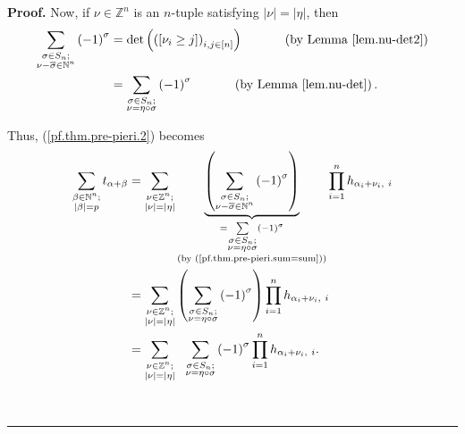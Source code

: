 \documentclass[numbers=enddot,12pt,final,onecolumn,notitlepage,english]{scrartcl}%
\theoremstyle{definition}
\newenvironment{proof}[1][Proof]{\noindent\textbf{#1.} }{\ \rule{0.5em}{0.5em}}
\let\sumnonlimits\sum
\let\prodnonlimits\prod
\renewcommand{\sum}{\sumnonlimits\limits}
\renewcommand{\prod}{\prodnonlimits\limits}
\newenvironment{verlong}{}{}
\begin{document}
\begin{verlong}
\begin{proof}
Now, if $\nu\in\mathbb{Z}^{n}$ is an $n$-tuple satisfying $\left\vert
\nu\right\vert =\left\vert \eta\right\vert $, then%
\begin{align}
\sum_{\substack{\sigma\in S_{n};\\\nu-\overline{\sigma}\in\mathbb{N}^{n}%
}}\left(  -1\right)  ^{\sigma}  &  =\det\left(  \left(  \left[  \nu_{i}\geq
j\right]  \right)  _{i,j\in\left[  n\right]  }\right)
\ \ \ \ \ \ \ \ \ \ \left(  \text{by Lemma \ref{lem.nu-det2}}\right)
\nonumber\\
&  =\sum_{\substack{\sigma\in S_{n};\\\nu=\eta\circ\sigma}}\left(  -1\right)
^{\sigma}\ \ \ \ \ \ \ \ \ \ \left(  \text{by Lemma \ref{lem.nu-det}}\right)
. \label{pf.thm.pre-pieri.sum=sum}%
\end{align}


Thus, (\ref{pf.thm.pre-pieri.2}) becomes%
\begin{align}
\sum_{\substack{\beta\in\mathbb{N}^{n};\\\left\vert \beta\right\vert
=p}}t_{\alpha+\beta}  &  =\sum_{\substack{\nu\in\mathbb{Z}^{n};\\\left\vert
\nu\right\vert =\left\vert \eta\right\vert }}\underbrace{\left(
\sum_{\substack{\sigma\in S_{n};\\\nu-\overline{\sigma}\in\mathbb{N}^{n}%
}}\left(  -1\right)  ^{\sigma}\right)  }_{\substack{=\sum_{\substack{\sigma\in
S_{n};\\\nu=\eta\circ\sigma}}\left(  -1\right)  ^{\sigma}\\\text{(by
(\ref{pf.thm.pre-pieri.sum=sum}))}}}\prod_{i=1}^{n}h_{\alpha_{i}+\nu_{i}%
,\ i}\nonumber\\
&  =\sum_{\substack{\nu\in\mathbb{Z}^{n};\\\left\vert \nu\right\vert
=\left\vert \eta\right\vert }}\left(  \sum_{\substack{\sigma\in S_{n}%
;\\\nu=\eta\circ\sigma}}\left(  -1\right)  ^{\sigma}\right)  \prod_{i=1}%
^{n}h_{\alpha_{i}+\nu_{i},\ i}\nonumber\\
&  =\sum_{\substack{\nu\in\mathbb{Z}^{n};\\\left\vert \nu\right\vert
=\left\vert \eta\right\vert }}\ \ \sum_{\substack{\sigma\in S_{n};\\\nu
=\eta\circ\sigma}}\left(  -1\right)  ^{\sigma}\prod_{i=1}^{n}h_{\alpha_{i}%
+\nu_{i},\ i}. \label{pf.thm.pre-pieri.2b}%
\end{align}



\end{proof}
\end{verlong}
\end{document}
